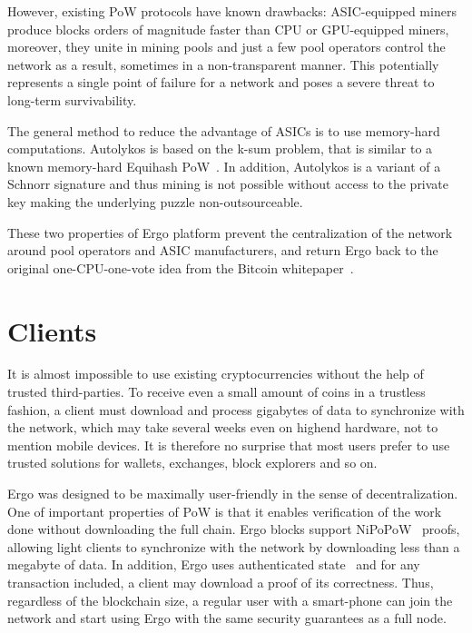 \documentclass[]{article}
\begin{document}
    However, existing PoW protocols have known drawbacks: ASIC-equipped miners produce
    blocks orders of magnitude faster than CPU or GPU-equipped miners, moreover, they unite in
    mining pools and just a few pool operators control the network as a result, sometimes in a non-transparent
    manner. This potentially represents a single point of failure for a network and poses
    a severe threat to long-term survivability.

    The general method to reduce the advantage of ASICs is to use memory-hard computations.
    Autolykos is based on the k-sum problem, that is similar to a known memory-hard Equihash
    PoW~\cite{biryukov2017equihash}. In addition, Autolykos is a variant of a Schnorr signature and thus mining is not
    possible without access to the private key making the underlying puzzle non-outsourceable.

    These two properties of Ergo platform prevent the centralization of the network around pool
    operators and ASIC manufacturers, and return Ergo back to the original one-CPU-one-vote idea
    from the Bitcoin whitepaper~\cite{nakamoto2008bitcoin}.

    \section{Clients}

    It is almost impossible to use existing cryptocurrencies without the help of trusted third-parties.
    To receive even a small amount of coins in a trustless fashion, a client must download and process
    gigabytes of data to synchronize with the network, which may take several weeks even on highend
    hardware, not to mention mobile devices. It is therefore no surprise that most users prefer
    to use trusted solutions for wallets, exchanges, block explorers and so on.

    Ergo was designed to be maximally user-friendly in the sense of decentralization. One of
    important properties of PoW is that it enables verification of the work done without downloading
    the full chain. Ergo blocks support NiPoPoW~\cite{kiayias2017non} proofs, allowing light clients to
    synchronize with the network by downloading less than a megabyte of data. In addition, Ergo uses
    authenticated state~\cite{reyzin2017improving} and for any transaction included, a client may download a proof of its
    correctness. Thus, regardless of the blockchain size, a regular user with a smart-phone can join
    the network and start using Ergo with the same security guarantees as a full node.
\end{document}
